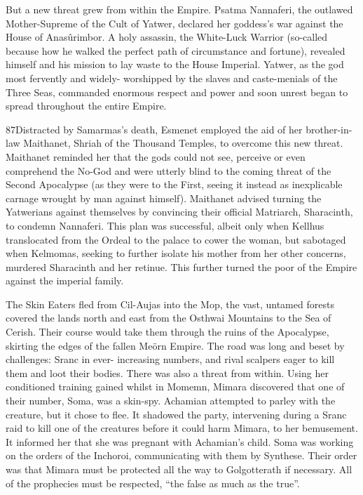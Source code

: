 \documentclass[]{book}
\begin{document}
But a new threat grew from within the Empire. Psatma Nannaferi, the outlawed
Mother-Supreme of the Cult of Yatwer, declared her goddess's war against the House of
Anasûrimbor. A holy assassin, the White-Luck Warrior (so-called because how he
walked the perfect path of circumstance and fortune), revealed himself and his mission
to lay waste to the House Imperial. Yatwer, as the god most fervently and widely-
worshipped by the slaves and caste-menials of the Three Seas, commanded enormous
respect and power and soon unrest began to spread throughout the entire Empire.

87Distracted by Samarmas's death, Esmenet employed the aid of her brother-in-law
Maithanet, Shriah of the Thousand Temples, to overcome this new threat. Maithanet
reminded her that the gods could not see, perceive or even comprehend the No-God
and were utterly blind to the coming threat of the Second Apocalypse (as they were to
the First, seeing it instead as inexplicable carnage wrought by man against himself).
Maithanet advised turning the Yatwerians against themselves by convincing their
official Matriarch, Sharacinth, to condemn Nannaferi. This plan was successful, albeit
only when Kellhus translocated from the Ordeal to the palace to cower the woman, but
sabotaged when Kelmomas, seeking to further isolate his mother from her other
concerns, murdered Sharacinth and her retinue. This further turned the poor of the
Empire against the imperial family.

The Skin Eaters fled from Cil-Aujas into the Mop, the vast, untamed forests covered
the lands north and east from the Osthwai Mountains to the Sea of Cerish. Their
course would take them through the ruins of the Apocalypse, skirting the edges of the
fallen Meörn Empire. The road was long and beset by challenges: Sranc in ever-
increasing numbers, and rival scalpers eager to kill them and loot their bodies. There
was also a threat from within. Using her conditioned training gained whilst in
Momemn, Mimara discovered that one of their number, Soma, was a skin-spy.
Achamian attempted to parley with the creature, but it chose to flee. It shadowed the
party, intervening during a Sranc raid to kill one of the creatures before it could harm
Mimara, to her bemusement. It informed her that she was pregnant with Achamian's
child. Soma was working on the orders of the Inchoroi, communicating with them by
Synthese. Their order was that Mimara must be protected all the way to Golgotterath if
necessary. All of the prophecies must be respected, ``the false as much as the true''.
\end{document}
